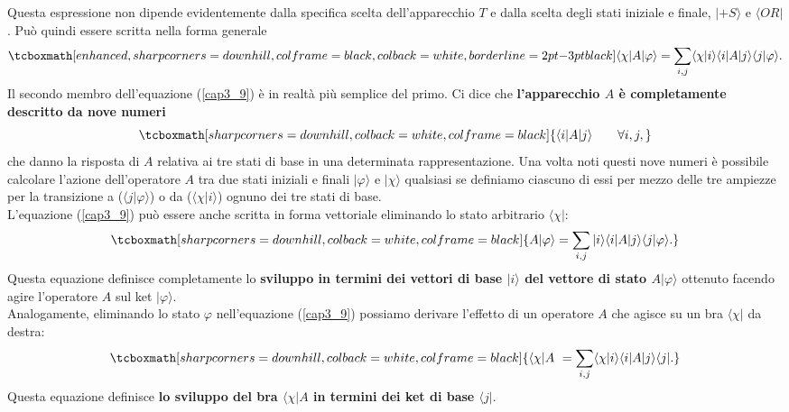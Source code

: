 \documentclass[a4paper,12pt,oneside]{book}
\begin{document}
Questa espressione non dipende evidentemente dalla specifica scelta dell'apparecchio $T$ e dalla scelta degli stati iniziale e finale, $| +S \rangle $ e $\langle OR |$. Può quindi essere scritta nella forma generale
	\begin{equation}
		\tcboxmath[enhanced, sharp corners=downhill, colframe=black, colback=white, borderline={2pt}{-3pt}{black}]{
			\langle \chi | A | \varphi \rangle = \sum \limits_{i,j} \langle \chi | i \rangle \langle i | A | j \rangle \langle j | \varphi \rangle .
			}
	\label{cap3_9}
	\end{equation}
Il secondo membro dell'equazione (\ref{cap3_9}) è in realtà più semplice del primo. Ci dice che \textbf{l'apparecchio $A$ è completamente descritto da nove numeri}
	\begin{equation}
		\tcboxmath[sharp corners=downhill, colback=white, colframe=black]{
			\langle i | A | j \rangle  \qquad \forall i,j ,
			}
	\end{equation}
che danno la risposta di $A$ relativa ai tre stati di base in una determinata rappresentazione. Una volta noti questi nove numeri è possibile calcolare l'azione dell'operatore $A$ tra due stati iniziali e finali $| \varphi \rangle $ e $| \chi \rangle$ qualsiasi se definiamo ciascuno di essi per mezzo delle tre ampiezze per la transizione a ($\langle j | \varphi \rangle $) o da ($\langle \chi | i \rangle$) ognuno dei tre stati di base.\\

L'equazione (\ref{cap3_9}) può essere anche scritta in forma vettoriale eliminando lo stato arbitrario $\langle \chi | $:
	\begin{equation}
		\tcboxmath[sharp corners=downhill, colback=white, colframe=black]{
			A| \varphi \rangle = \sum \limits_{i,j}  |i \rangle \langle i | A | j \rangle \langle j | \varphi \rangle .
			}
	\label{cap3_10}
	\end{equation}
Questa equazione definisce completamente lo \textbf{sviluppo in termini dei vettori di base $ | i \rangle$ del vettore di stato $A | \varphi \rangle $} ottenuto facendo agire l'operatore $A$ sul ket $ | \varphi \rangle$.\\

Analogamente, eliminando lo stato $\varphi$ nell'equazione (\ref{cap3_9}) possiamo derivare l'effetto di un operatore $A$ che agisce su un bra $ \langle \chi |$ da destra:
	\begin{equation}
		\tcboxmath[sharp corners=downhill, colback=white, colframe=black]{
			\langle \chi | A\ = \sum \limits_{i,j} \langle \chi | i \rangle \langle i | A  | j \rangle \langle j | .
			}	
	\label{cap3_11}
	\end{equation}
Questa equazione definisce \textbf{lo sviluppo del bra $\langle \chi |A$ in termini dei ket di base $\langle j |$}.\\
\end{document}
